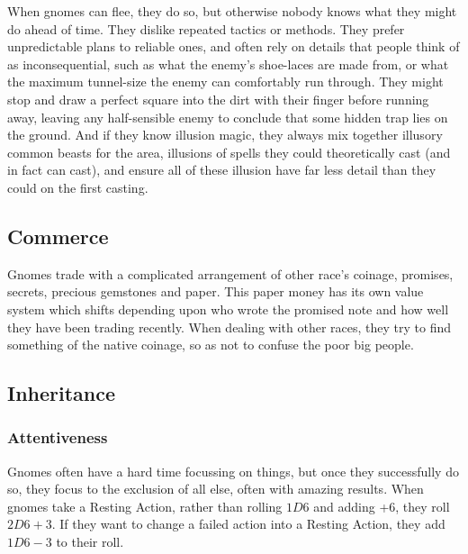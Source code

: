 \begin{multicols}{2}
When gnomes can flee, they do so, but otherwise nobody knows what they might do ahead of time.
They dislike repeated tactics or methods.
They prefer unpredictable plans to reliable ones, and often rely on details that people think of as inconsequential, such as what the enemy's shoe-laces are made from, or what the maximum tunnel-size the enemy can comfortably run through.
They might stop and draw a perfect square into the dirt with their finger before running away, leaving any half-sensible enemy to conclude that some hidden trap lies on the ground.
And if they know illusion magic, they always mix together illusory common beasts for the area, illusions of spells they could theoretically cast (and in fact can cast), and ensure all of these illusion have far less detail than they could on the first casting.

\subsection{Commerce}

Gnomes trade with a complicated arrangement of other race's coinage, promises, secrets, precious gemstones and paper. This paper money has its own value system which shifts depending upon who wrote the promised note and how well they have been trading recently. When dealing with other races, they try to find something of the native coinage, so as not to confuse the poor big people.

\subsection{Inheritance}

\subsubsection[Attentiveness: roll 2D6+3 for resting actions]{Attentiveness}
\label{gnomishInheritance}

Gnomes often have a hard time focussing on things, but once they successfully do so, they focus to the exclusion of all else, often with amazing results.
When gnomes take a Resting Action, rather than rolling $1D6$ and adding +6, they roll $2D6+3$.
If they want to change a failed action into a Resting Action, they add $1D6-3$ to their roll.

\subsubsection{}


\end{multicols}
